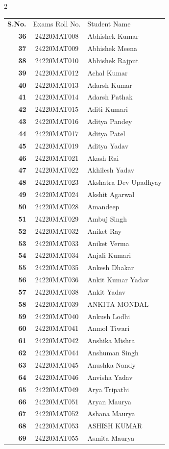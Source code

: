 \documentclass[10pt,a4paper]{article}
\begin{document}
\begin{multicols}{2}
\noindent
\begin{tabular}{>{\boldmath\bfseries\color{headerblue}}r c l}
\rowcolor{headerblue}
\color{white}S.No. & \color{white}Exams Roll No. & \color{white}Student Name \\
36 & 24220MAT008 & Abhishek Kumar \\
37 & 24220MAT009 & Abhishek Meena \\
38 & 24220MAT010 & Abhishek Rajput \\
39 & 24220MAT012 & Achal Kumar \\
40 & 24220MAT013 & Adarsh Kumar \\
41 & 24220MAT014 & Adarsh Pathak \\
42 & 24220MAT015 & Aditi Kumari \\
43 & 24220MAT016 & Aditya Pandey \\
44 & 24220MAT017 & Aditya Patel \\
45 & 24220MAT019 & Aditya Yadav \\
46 & 24220MAT021 & Akash Rai \\
47 & 24220MAT022 & Akhilesh Yadav \\
48 & 24220MAT023 & Akshatra Dev Upadhyay \\
49 & 24220MAT024 & Akshit Agarwal \\
50 & 24220MAT028 & Amandeep \\
51 & 24220MAT029 & Ambuj Singh \\
52 & 24220MAT032 & Aniket Ray \\
53 & 24220MAT033 & Aniket Verma \\
54 & 24220MAT034 & Anjali Kumari \\
55 & 24220MAT035 & Ankesh Dhakar \\
56 & 24220MAT036 & Ankit Kumar Yadav \\
57 & 24220MAT038 & Ankit Yadav \\
58 & 24220MAT039 & ANKITA MONDAL \\
59 & 24220MAT040 & Ankush Lodhi \\
60 & 24220MAT041 & Anmol Tiwari \\
61 & 24220MAT042 & Anshika Mishra \\
62 & 24220MAT044 & Anshuman Singh \\
63 & 24220MAT045 & Anushka Nandy \\
64 & 24220MAT046 & Anvisha Yadav \\
65 & 24220MAT049 & Arya Tripathi \\
66 & 24220MAT051 & Aryan Maurya \\
67 & 24220MAT052 & Ashana Maurya \\
68 & 24220MAT053 & ASHISH KUMAR \\
69 & 24220MAT055 & Asmita Maurya \\
\end{tabular}

\end{multicols}
\end{document}
